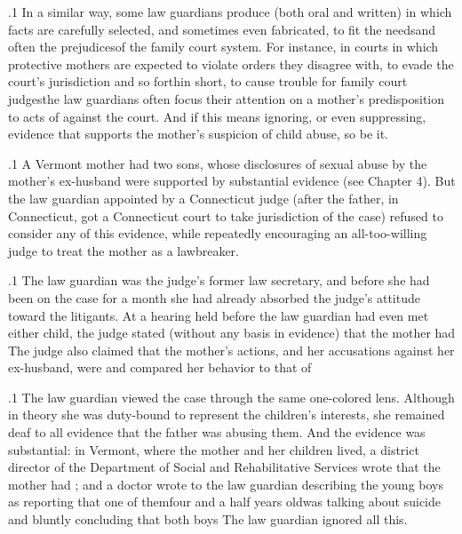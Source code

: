 \documentclass[11pt, twoside]{article}
\begin{document}
{\p.1{%
In a similar way, some law guardians produce  (both oral and
written) in which facts are carefully selected, and sometimes even fabricated, to fit the needs\mdash{}and often the prejudices\mdash{}of the family court
system. For instance, in courts in which protective mothers are expected
to violate orders they disagree with, to evade the court’s jurisdiction and
so forth\mdash{}in short, to cause trouble for family court judges\mdash{}the law
guardians often focus their attention on a mother’s predisposition to acts
of  against the court. And if this means ignoring, or even suppressing, evidence that supports the mother’s suspicion of child abuse,
so be it.
}%

\p.1{%
A Vermont mother had two sons, whose disclosures of sexual abuse
by the mother’s ex-husband were supported by substantial evidence (see
Chapter 4). But the law guardian appointed by a Connecticut judge (after
the father, in Connecticut, got a Connecticut court to take jurisdiction
of the case) refused to consider any of this evidence, while repeatedly
encouraging an all-too-willing judge to treat the mother as a lawbreaker.
}%

\p.1{%
The law guardian was the judge’s former law secretary, and before she
had been on the case for a month she had already absorbed the judge’s
attitude toward the litigants. At a hearing held before the law guardian
had even met either child, the judge stated (without any basis in evidence) that the mother had  The judge also claimed that the mother’s
actions, and her accusations against her ex-husband, were 
and compared her behavior to that of 
}%

\p.1{%
The law guardian viewed the case through the same one-colored lens.
Although in theory she was duty-bound to represent the children’s interests, she remained deaf to all evidence that the father was abusing
them. And the evidence was substantial: in Vermont, where the mother
and her children lived, a district director of the Department of Social
and Rehabilitative Services wrote that the mother had ; and a doctor wrote to the
law guardian describing the young boys as  reporting
that one of them\mdash{}four and a half years old\mdash{}was talking about suicide
and bluntly concluding that both boys  The
law guardian ignored all this.
}%

}
\end{document}
